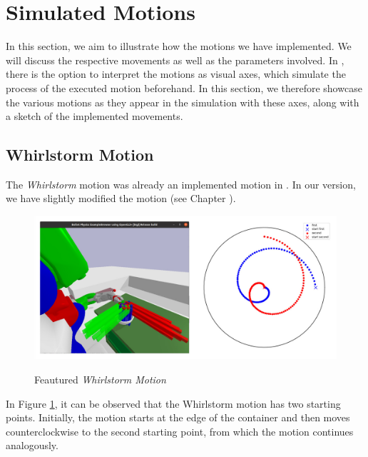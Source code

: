 \section{Simulated Motions}
\label{sec:simulated motions}
In this section, we aim to illustrate how the motions we have implemented.
We will discuss the respective movements as well as the parameters involved. In , there is the option to interpret the motions as visual axes, which simulate the process of the executed motion beforehand. In this section, we therefore showcase the various motions as they appear in the simulation with these axes, along with a sketch of the implemented movements.



\subsection{Whirlstorm Motion}
The \textit{Whirlstorm} motion was already an implemented motion in . In our version, we have slightly modified the motion (see Chapter ).

\begin{figure}[H]
    \includegraphics[scale=0.3]{Graphics/whirlstorm_showcase.jpg}
    \label{fig:whirlstormshowcase}
    \caption{Feautured \textit{Whirlstorm Motion}}
\end{figure}

In Figure \ref{fig:whirlstormshowcase}, it can be observed that the Whirlstorm motion has two starting points. Initially, the motion starts at the edge of the container and then moves counterclockwise to the second starting point, from which the motion continues analogously.

